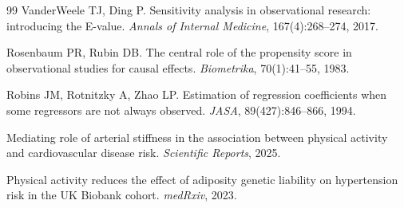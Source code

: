 \documentclass[12pt,a4paper]{article}
\begin{document}
\begin{thebibliography}{99}
VanderWeele TJ, Ding P.
Sensitivity analysis in observational research: introducing the E-value.
\textit{Annals of Internal Medicine}, 167(4):268--274, 2017.

Rosenbaum PR, Rubin DB.
The central role of the propensity score in observational studies for causal effects.
\textit{Biometrika}, 70(1):41--55, 1983.

Robins JM, Rotnitzky A, Zhao LP.
Estimation of regression coefficients when some regressors are not always observed.
\textit{JASA}, 89(427):846--866, 1994.

Mediating role of arterial stiffness in the association between physical activity and cardiovascular disease risk.
\textit{Scientific Reports}, 2025.

Physical activity reduces the effect of adiposity genetic liability on hypertension risk in the UK Biobank cohort.
\textit{medRxiv}, 2023.

\end{thebibliography}
\end{document}
